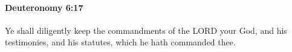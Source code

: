 			\begin{framed}
			\scriptsize
				\begin{compactdesc}
					\item[BHS] 
					\item[LXX] 
				\end{compactdesc}
			\end{framed}

		\paragraph{Deuteronomy 6:17} %
			\label{DEUTERONOMY-6-17}

			Ye shall diligently keep the commandments of the LORD your God, and his testimonies, and his statutes, which he hath commanded thee.


